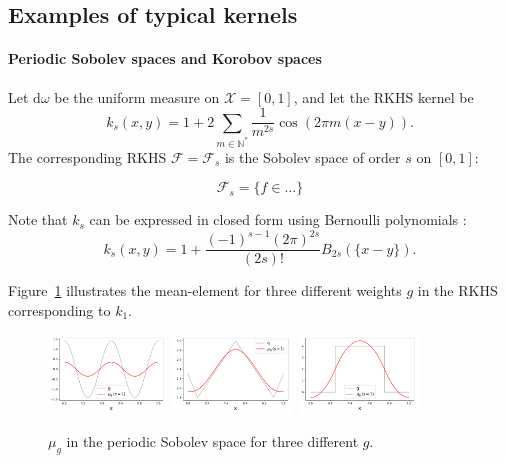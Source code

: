 \documentclass[twoside,11pt]{book}
\begin{document}
\subsection{Examples of typical kernels}
\label{subsec:kernel_examples}
\paragraph{Periodic Sobolev spaces and Korobov spaces}




Let $\mathrm{d}\omega$ be the uniform measure on $\mathcal{X} = [0,1]$, and let the RKHS kernel be \citep{BeTh11}
\begin{equation}
k_{s}(x,y) = 1+ 2\sum\limits_{m \in \mathbb{N}^{*}} \frac{1}{m^{2s}} \cos(2\pi m(x-y)).
\end{equation}
The corresponding RKHS $\mathcal{F}=\mathcal{F}_{s}$ is the Sobolev space of order $s$ on $[0,1]$:

\begin{equation}
\mathcal{F}_{s} = \{f \in ... \}
\end{equation}



 Note that $k_{s}$ can be expressed in closed form using Bernoulli polynomials \cite{Wah90}:
\begin{equation}
k_{s}(x,y) = 1 + \frac{(-1)^{s-1}(2 \pi)^{2s}}{(2s)!} B_{2s}(\{x-y\}).
\end{equation}

Figure~\ref{fig:mean_element} illustrates the mean-element for three different weights $g$ in the RKHS corresponding to $k_{1}$.

\begin{figure}[]
    \centering
\includegraphics[width= 0.28\textwidth]{img/mean_element/Sobolev/mean_element_cos_ko_1.pdf}~\includegraphics[width= 0.28\textwidth]{img/mean_element/Sobolev/mean_element_saw_ko_1.pdf}~\includegraphics[width= 0.28\textwidth]{img/mean_element/Sobolev/mean_element_step_ko_1.pdf}\\
\caption{$\mu_{g}$ in the periodic Sobolev space for three different $g$.
\label{fig:mean_element}}
\end{figure}
\end{document}
